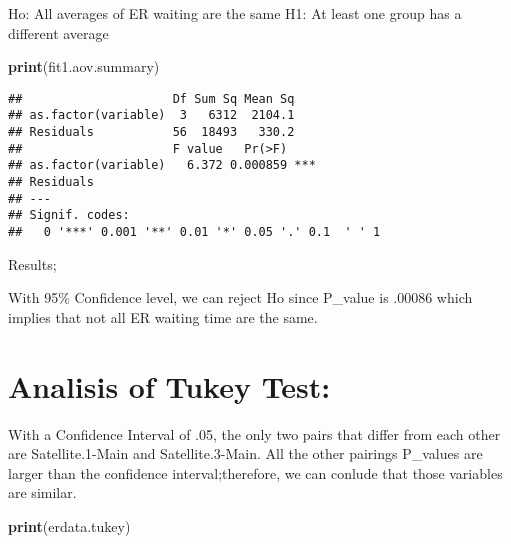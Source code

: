 \documentclass[]{tufte-handout}
\newenvironment{Shaded}{}{}
\newcommand{\KeywordTok}[1]{\textcolor[rgb]{0.00,0.44,0.13}{\textbf{{#1}}}}
\newcommand{\NormalTok}[1]{{#1}}
\begin{document}
Ho: All averages of ER waiting are the same H1: At least one group has a
different average

\begin{Shaded}
\begin{Highlighting}[]
\KeywordTok{print}\NormalTok{(fit1.aov.summary)}
\end{Highlighting}
\end{Shaded}

\begin{verbatim}
##                     Df Sum Sq Mean Sq
## as.factor(variable)  3   6312  2104.1
## Residuals           56  18493   330.2
##                     F value   Pr(>F)    
## as.factor(variable)   6.372 0.000859 ***
## Residuals                               
## ---
## Signif. codes:  
##   0 '***' 0.001 '**' 0.01 '*' 0.05 '.' 0.1  ' ' 1
\end{verbatim}

Results;

With 95\% Confidence level, we can reject Ho since P\_value is .00086
which implies that not all ER waiting time are the same.

\section{Analisis of Tukey Test:}\label{analisis-of-tukey-test}

With a Confidence Interval of .05, the only two pairs that differ from
each other are Satellite.1-Main and Satellite.3-Main. All the other
pairings P\_values are larger than the confidence interval;therefore, we
can conlude that those variables are similar.

\begin{Shaded}
\begin{Highlighting}[]
\KeywordTok{print}\NormalTok{(erdata.tukey)}
\end{Highlighting}
\end{Shaded}
\end{document}
